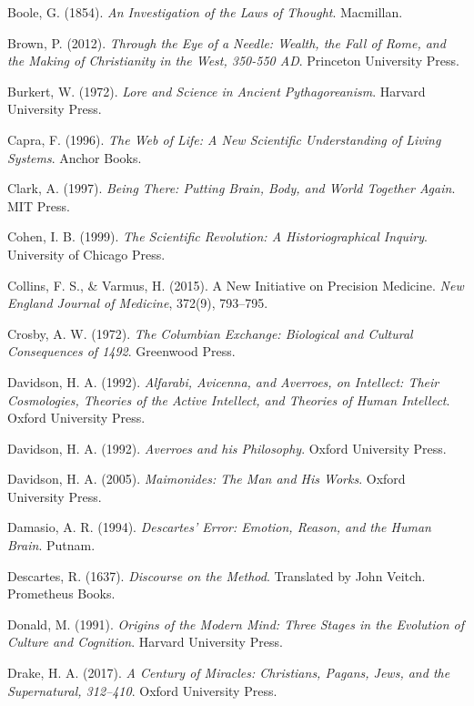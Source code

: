 \documentclass[twocolumn]{article}
\begin{document}
\begin{thebibliography}{99}
Boole, G. (1854). \textit{An Investigation of the Laws of Thought}. Macmillan.

Brown, P. (2012). \textit{Through the Eye of a Needle: Wealth, the Fall of Rome, and the Making of Christianity in the West, 350-550 AD}. Princeton University Press.

Burkert, W. (1972). \textit{Lore and Science in Ancient Pythagoreanism}. Harvard University Press.

Capra, F. (1996). \textit{The Web of Life: A New Scientific Understanding of Living Systems}. Anchor Books.

Clark, A. (1997). \textit{Being There: Putting Brain, Body, and World Together Again}. MIT Press.

Cohen, I. B. (1999). \textit{The Scientific Revolution: A Historiographical Inquiry}. University of Chicago Press.

Collins, F. S., \& Varmus, H. (2015). A New Initiative on Precision Medicine. \textit{New England Journal of Medicine}, 372(9), 793–795.

Crosby, A. W. (1972). \textit{The Columbian Exchange: Biological and Cultural Consequences of 1492}. Greenwood Press.

Davidson, H. A. (1992). \textit{Alfarabi, Avicenna, and Averroes, on Intellect: Their Cosmologies, Theories of the Active Intellect, and Theories of Human Intellect}. Oxford University Press.

Davidson, H. A. (1992). \textit{Averroes and his Philosophy}. Oxford University Press.

Davidson, H. A. (2005). \textit{Maimonides: The Man and His Works}. Oxford University Press.

Damasio, A. R. (1994). \textit{Descartes' Error: Emotion, Reason, and the Human Brain}. Putnam.

Descartes, R. (1637). \textit{Discourse on the Method}. Translated by John Veitch. Prometheus Books.

Donald, M. (1991). \textit{Origins of the Modern Mind: Three Stages in the Evolution of Culture and Cognition}. Harvard University Press.

Drake, H. A. (2017). \textit{A Century of Miracles: Christians, Pagans, Jews, and the Supernatural, 312–410}. Oxford University Press.


\end{thebibliography}
\end{document}
